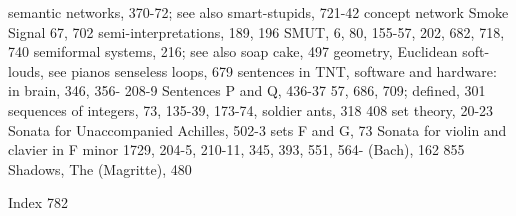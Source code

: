 semantic networks, 370-72; see also              smart-stupids, 721-42
concept network                                  Smoke Signal 67, 702
semi-interpretations, 189, 196                   SMUT, 6, 80, 155-57, 202, 682, 718, 740
semiformal systems, 216; see also                soap cake, 497
geometry, Euclidean                              soft-louds, see pianos
senseless loops, 679 sentences in TNT,           software and hardware: in brain, 346, 356-
208-9 Sentences P and Q, 436-37                  57, 686, 709; defined, 301
sequences of integers, 73, 135-39, 173-74,       soldier ants, 318
408 set theory, 20-23                            Sonata for Unaccompanied Achilles, 502-3
sets F and G, 73                                 Sonata for violin and clavier in F minor
1729, 204-5, 210-11, 345, 393, 551, 564-         (Bach), 162
855 Shadows, The (Magritte), 480



Index                                                                                   782

